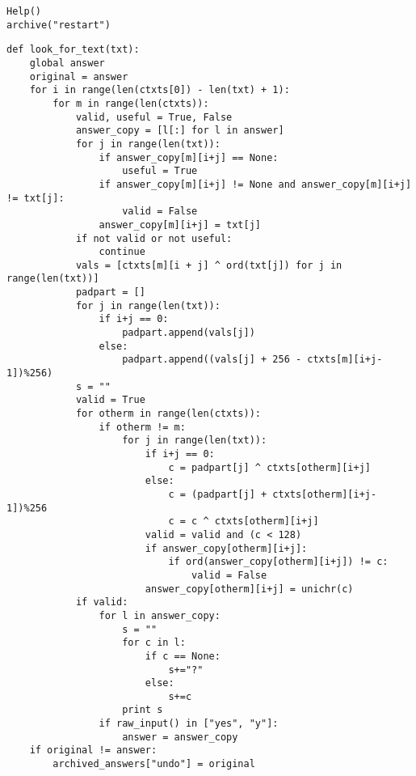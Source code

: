 \documentclass[11pt]{article}
\begin{document}
\begin{verbatim}
Help()
archive("restart")
\end{verbatim}\newpage\begin{verbatim}
def look_for_text(txt):
    global answer
    original = answer
    for i in range(len(ctxts[0]) - len(txt) + 1):
        for m in range(len(ctxts)):
            valid, useful = True, False
            answer_copy = [l[:] for l in answer]
            for j in range(len(txt)):
                if answer_copy[m][i+j] == None:
                    useful = True
                if answer_copy[m][i+j] != None and answer_copy[m][i+j] != txt[j]:
                    valid = False
                answer_copy[m][i+j] = txt[j]
            if not valid or not useful:
                continue
            vals = [ctxts[m][i + j] ^ ord(txt[j]) for j in range(len(txt))]
            padpart = []
            for j in range(len(txt)):
                if i+j == 0:
                    padpart.append(vals[j])
                else:
                    padpart.append((vals[j] + 256 - ctxts[m][i+j-1])%256)
            s = ""
            valid = True
            for otherm in range(len(ctxts)):
                if otherm != m:
                    for j in range(len(txt)):
                        if i+j == 0:
                            c = padpart[j] ^ ctxts[otherm][i+j]
                        else:
                            c = (padpart[j] + ctxts[otherm][i+j-1])%256
                            c = c ^ ctxts[otherm][i+j]
                        valid = valid and (c < 128)
                        if answer_copy[otherm][i+j]:
                            if ord(answer_copy[otherm][i+j]) != c:
                                valid = False
                        answer_copy[otherm][i+j] = unichr(c)
            if valid:
                for l in answer_copy:
                    s = ""
                    for c in l:
                        if c == None:
                            s+="?"
                        else:
                            s+=c
                    print s
                if raw_input() in ["yes", "y"]:
                    answer = answer_copy
    if original != answer:
        archived_answers["undo"] = original
\end{verbatim}
\end{document}

